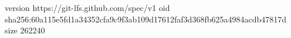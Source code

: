 version https://git-lfs.github.com/spec/v1
oid sha256:60a115e5fd1a34352cfa9c9f3ab109d17612faf3d368fb625a4984acdb47817d
size 262240
